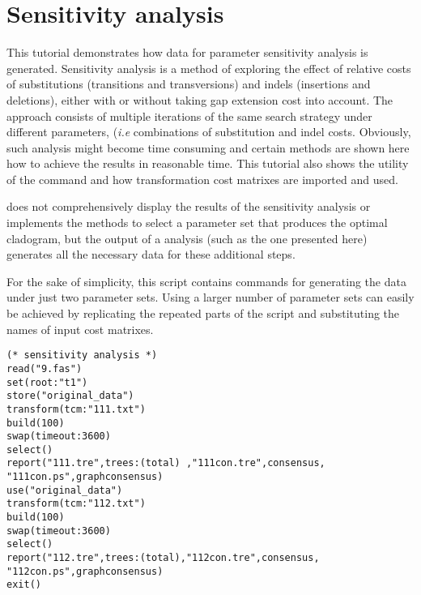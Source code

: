 \section{Sensitivity analysis}{\label{tutorial4.5}}

This tutorial demonstrates how data for parameter sensitivity analysis is generated. Sensitivity analysis \cite{wheeler1995} is a method of exploring the effect of relative costs of substitutions (transitions and transversions) and indels (insertions and deletions), either with or without taking gap extension cost into account. The approach consists of multiple iterations of the same search strategy under different parameters, (\emph{i.e} combinations of substitution and indel costs. Obviously, such analysis might become time consuming and certain methods are shown here how to achieve the results in reasonable time. This tutorial also shows the utility of the command  and how transformation cost matrixes are imported and used.

\poy does not comprehensively display the results of the sensitivity analysis or implements the methods to select a parameter set that produces the optimal cladogram, but the output of a \poy analysis (such as the one presented here) generates all the necessary data for these additional steps.

For the sake of simplicity, this script contains commands for generating the data under just two parameter  sets. Using a larger number of parameter sets can easily be achieved by replicating the repeated parts of the script and substituting the names of input cost matrixes.

\begin{verbatim}
(* sensitivity analysis *)
read("9.fas")
set(root:"t1")
store("original_data")
transform(tcm:"111.txt")
build(100)
swap(timeout:3600)
select()
report("111.tre",trees:(total) ,"111con.tre",consensus,
"111con.ps",graphconsensus)
use("original_data")
transform(tcm:"112.txt")
build(100)
swap(timeout:3600)
select()
report("112.tre",trees:(total),"112con.tre",consensus,
"112con.ps",graphconsensus)
exit()
\end{verbatim}

